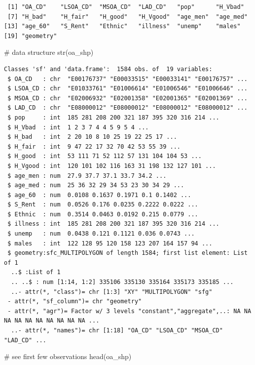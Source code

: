 \documentclass[
  letterpaper,
  DIV=11,
  numbers=noendperiod,
  oneside]{scrreprt}
\newenvironment{Shaded}{\begin{snugshade}}{\end{snugshade}}
\newcommand{\CommentTok}[1]{\textcolor[rgb]{0.37,0.37,0.37}{#1}}
\newcommand{\FunctionTok}[1]{\textcolor[rgb]{0.28,0.35,0.67}{#1}}
\newcommand{\NormalTok}[1]{\textcolor[rgb]{0.00,0.23,0.31}{#1}}
\begin{document}
\begin{verbatim}
 [1] "OA_CD"    "LSOA_CD"  "MSOA_CD"  "LAD_CD"   "pop"      "H_Vbad"  
 [7] "H_bad"    "H_fair"   "H_good"   "H_Vgood"  "age_men"  "age_med" 
[13] "age_60"   "S_Rent"   "Ethnic"   "illness"  "unemp"    "males"   
[19] "geometry"
\end{verbatim}

\begin{Shaded}
\begin{Highlighting}[]
\CommentTok{\# data structure}
\FunctionTok{str}\NormalTok{(oa\_shp)}
\end{Highlighting}
\end{Shaded}

\begin{verbatim}
Classes 'sf' and 'data.frame':  1584 obs. of  19 variables:
 $ OA_CD   : chr  "E00176737" "E00033515" "E00033141" "E00176757" ...
 $ LSOA_CD : chr  "E01033761" "E01006614" "E01006546" "E01006646" ...
 $ MSOA_CD : chr  "E02006932" "E02001358" "E02001365" "E02001369" ...
 $ LAD_CD  : chr  "E08000012" "E08000012" "E08000012" "E08000012" ...
 $ pop     : int  185 281 208 200 321 187 395 320 316 214 ...
 $ H_Vbad  : int  1 2 3 7 4 4 5 9 5 4 ...
 $ H_bad   : int  2 20 10 8 10 25 19 22 25 17 ...
 $ H_fair  : int  9 47 22 17 32 70 42 53 55 39 ...
 $ H_good  : int  53 111 71 52 112 57 131 104 104 53 ...
 $ H_Vgood : int  120 101 102 116 163 31 198 132 127 101 ...
 $ age_men : num  27.9 37.7 37.1 33.7 34.2 ...
 $ age_med : num  25 36 32 29 34 53 23 30 34 29 ...
 $ age_60  : num  0.0108 0.1637 0.1971 0.1 0.1402 ...
 $ S_Rent  : num  0.0526 0.176 0.0235 0.2222 0.0222 ...
 $ Ethnic  : num  0.3514 0.0463 0.0192 0.215 0.0779 ...
 $ illness : int  185 281 208 200 321 187 395 320 316 214 ...
 $ unemp   : num  0.0438 0.121 0.1121 0.036 0.0743 ...
 $ males   : int  122 128 95 120 158 123 207 164 157 94 ...
 $ geometry:sfc_MULTIPOLYGON of length 1584; first list element: List of 1
  ..$ :List of 1
  .. ..$ : num [1:14, 1:2] 335106 335130 335164 335173 335185 ...
  ..- attr(*, "class")= chr [1:3] "XY" "MULTIPOLYGON" "sfg"
 - attr(*, "sf_column")= chr "geometry"
 - attr(*, "agr")= Factor w/ 3 levels "constant","aggregate",..: NA NA NA NA NA NA NA NA NA NA ...
  ..- attr(*, "names")= chr [1:18] "OA_CD" "LSOA_CD" "MSOA_CD" "LAD_CD" ...
\end{verbatim}

\begin{Shaded}
\begin{Highlighting}[]
\CommentTok{\# see first few observations}
\FunctionTok{head}\NormalTok{(oa\_shp)}
\end{Highlighting}
\end{Shaded}
\end{document}
